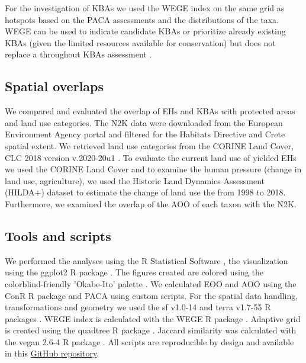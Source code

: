For the investigation of KBAs \parencite{iucn2016} we used the WEGE index \parencite{farooq2020wege}
on the same grid as hotspots based on the PACA assessments and the distributions
of the taxa. WEGE can be used to indicate candidate KBAs or prioritize already
existing KBAs (given the limited resources available for conservation) but does
not replace a throughout KBAs assessment \parencite{farooq2020wege}.

    \subsection{Spatial overlaps}
    \label{subsec:arthropods-spatial}
We compared and evaluated the overlap of EHs and KBAs with protected areas and
land use categories. The N2K data were downloaded from the European Environment
Agency portal and filtered for the Habitats Directive and Crete spatial extent.
We retrieved land use categories from the CORINE Land Cover, CLC 2018 version
v.2020-20u1 \parencite{agencycopernicus}.
To evaluate the current land use of yielded EHs we used the CORINE Land Cover
and to examine the human pressure (change in land use, agriculture), we used the
Historic Land Dynamics Assessment (HILDA+) dataset \parencite{winkler2021global} to
estimate the change of land use the from 1998 to 2018. Furthermore, we examined
the overlap of the AOO of each taxon with the N2K.


    \subsection{Tools and scripts}
    \label{subsec:arthropods-tools}
We performed the analyses using the R Statistical Software \parencite{r-core-team2023r:-a-language},
the visualization using the ggplot2 R package \parencite{wickham2016ggplot2}. The figures
created are colored using the colorblind-friendly 'Okabe-Ito' palette \parencite{ichihara2008color}.
We calculated EOO and AOO using the ConR R package \parencite{dauby2017conr:} and PACA
using custom scripts. For the spatial data handling, transformations and
geometry we used the sf v1.0-14 \parencite{pebesma2018simple} and terra v1.7-55 R packages \parencite{hijmans2024terra}.
WEGE index is calculated with the WEGE R package \parencite{farooq2020wege}.
Adaptive grid is created using the quadtree R package \parencite{friend2023quadtree}.
Jaccard similarity was calculated with the vegan 2.6-4 R package \parencite{oksanen2024vegan}.
All scripts are reproducible by design and available in this 
\href{https://github.com/savvas-paragkamian/arthropoda_assessment_crete}{GitHub repository}.


